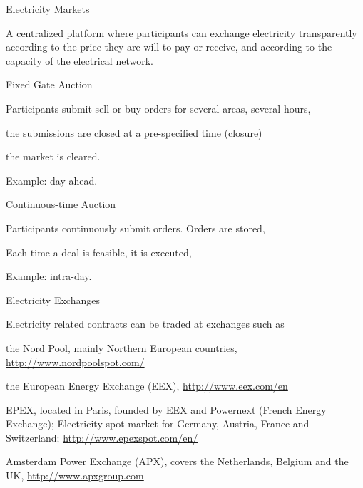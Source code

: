 {Electricity Markets}

A centralized platform where participants can exchange electricity transparently
according to the price they are will to pay or receive, and according to the capacity of
the electrical network.







	Fixed Gate Auction






	Participants submit sell or buy orders for several areas, several hours,


	the submissions are closed at a pre-specified time (closure)


	the market is cleared.


	Example: day-ahead.






	Continuous-time Auction






	Participants continuously submit orders. Orders are stored,


	Each time a deal is feasible, it is executed,


	Example: intra-day.










{Electricity Exchanges}

Electricity related contracts  can be traded at exchanges such as






	the Nord Pool, mainly Northern European countries, \url{http://www.nordpoolspot.com/}


	the European Energy Exchange (EEX), \url{http://www.eex.com/en}


	EPEX, located in Paris, founded by EEX and Powernext (French Energy Exchange);
Electricity spot market for Germany, Austria, France and Switzerland;
\url{http://www.epexspot.com/en/}


	Amsterdam Power Exchange (APX), covers the Netherlands, Belgium and the UK, \url{http://www.apxgroup.com}


